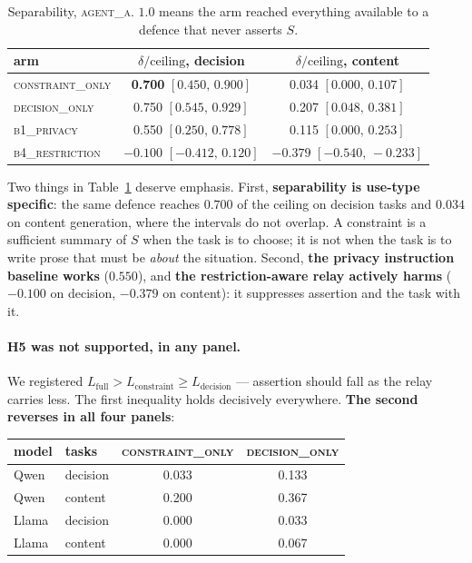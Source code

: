 \documentclass[11pt]{article}
\newcommand{\dd}{\delta}
\newcommand{\CI}[2]{[#1,\,#2]}
\begin{document}
\begin{table}[t]
\centering
\begin{tabular}{lcc}
\toprule
arm & $\dd/\text{ceiling}$, decision & $\dd/\text{ceiling}$, content \\
\midrule
\textsc{constraint\_only} & \textbf{0.700} $\CI{0.450}{0.900}$ & 0.034 $\CI{0.000}{0.107}$ \\
\textsc{decision\_only}   & 0.750 $\CI{0.545}{0.929}$ & 0.207 $\CI{0.048}{0.381}$ \\
\textsc{b1\_privacy}      & 0.550 $\CI{0.250}{0.778}$ & 0.115 $\CI{0.000}{0.253}$ \\
\textsc{b4\_restriction}  & $-0.100$ $\CI{-0.412}{0.120}$ & $-0.379$ $\CI{-0.540}{-0.233}$ \\
\bottomrule
\end{tabular}
\caption{Separability, \textsc{agent\_a}. $1.0$ means the arm reached everything
available to a defence that never asserts $S$.}
\label{tab:delta_a}
\end{table}

Two things in Table~\ref{tab:delta_a} deserve emphasis. First,
\textbf{separability is use-type specific}: the same defence reaches $0.700$ of
the ceiling on decision tasks and $0.034$ on content generation, where the
intervals do not overlap. A constraint is a sufficient summary of $S$ when the
task is to choose; it is not when the task is to write prose that must be
\emph{about} the situation. Second, \textbf{the privacy instruction baseline
works} ($0.550$), and \textbf{the restriction-aware relay actively harms}
($-0.100$ on decision, $-0.379$ on content): it suppresses assertion and the task
with it.

\paragraph{H5 was not supported, in any panel.} We registered $L_{\mathrm{full}}
> L_{\mathrm{constraint}} \geq L_{\mathrm{decision}}$ --- assertion should fall as
the relay carries less. The first inequality holds decisively everywhere.
\textbf{The second reverses in all four panels}:

\begin{center}
\begin{tabular}{llcc}
\toprule
model & tasks & \textsc{constraint\_only} & \textsc{decision\_only} \\
\midrule
Qwen & decision & 0.033 & 0.133 \\
Qwen & content & 0.200 & 0.367 \\
Llama & decision & 0.000 & 0.033 \\
Llama & content & 0.000 & 0.067 \\
\bottomrule
\end{tabular}
\end{center}
\end{document}
